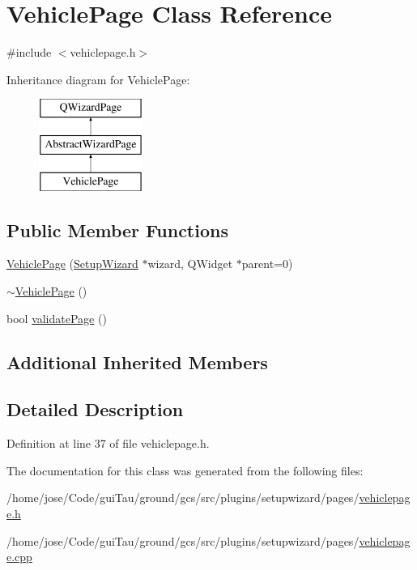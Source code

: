 \hypertarget{class_vehicle_page}{\section{Vehicle\-Page Class Reference}
\label{class_vehicle_page}
}


{\ttfamily \#include $<$vehiclepage.\-h$>$}

Inheritance diagram for Vehicle\-Page\-:\begin{figure}[H]
\begin{center}
\leavevmode
\includegraphics[height=3.000000cm]{class_vehicle_page}
\end{center}
\end{figure}
\subsection*{Public Member Functions}
\begin{DoxyCompactItemize}
\item 
\hyperlink{group___vehicle_page_ga974bbc2be70acc6ef6f222f2dbbacfc5}{Vehicle\-Page} (\hyperlink{class_setup_wizard}{Setup\-Wizard} $\ast$wizard, Q\-Widget $\ast$parent=0)
\item 
\hyperlink{group___vehicle_page_ga6044822bdc1c4412b29020cdac183d9f}{$\sim$\-Vehicle\-Page} ()
\item 
bool \hyperlink{group___vehicle_page_gacce2096fe1c6fff28ae7ff25dfe75e37}{validate\-Page} ()
\end{DoxyCompactItemize}
\subsection*{Additional Inherited Members}


\subsection{Detailed Description}


Definition at line 37 of file vehiclepage.\-h.



The documentation for this class was generated from the following files\-:\begin{DoxyCompactItemize}
\item 
/home/jose/\-Code/gui\-Tau/ground/gcs/src/plugins/setupwizard/pages/\hyperlink{vehiclepage_8h}{vehiclepage.\-h}\item 
/home/jose/\-Code/gui\-Tau/ground/gcs/src/plugins/setupwizard/pages/\hyperlink{vehiclepage_8cpp}{vehiclepage.\-cpp}\end{DoxyCompactItemize}

